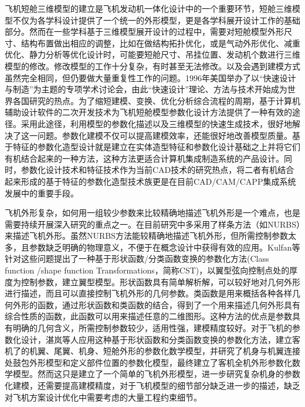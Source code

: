 \documentclass[12pt,a4paper]{report}
\begin{document}
飞机短舱三维模型的建立是飞机发动机一体化设计中的一个重要环节，短舱三维模型不仅为各学科设计提供了一个统一的外形模型，更是各学科展开设计工作的基础部分。然而在一些学科基于三维模型展开设计的过程中，需要对短舱模型外形尺寸、结构布置做出相应的调整，比如在做结构拓扑优化，或是气动外形优化、减重优化、静力分析等优化设计时，可能要短舱尺寸、吊挂位置、发动机个数进行三维模型的修改。修改模型的工作十分复杂，有时甚至无法修改。以及会遇到建模方式虽然完全相同，但仍要做大量重复性工作的问题。1996年美国举办了以“快速设计与制造”为主题的专项学术讨论会，由此“快速设计”理论、方法与技术开始成为世界各国研究的热点。为了缩短建模、变换、优化分析综合流程的周期，基于计算机辅助设计软件的二次开发技术为飞机短舱模型参数化设计方法提供了一种有效的途径。采用此途径，利用模型的参数化描述以及三维模型的快速生成技术，很好地解决了这一问题。参数化建模不仅可以提高建模效率，还能很好地改善模型质量。基于特征的参数化造型设计就是建立在实体造型特征和参数化设计基础之上并将它们有机结合起来的一种方法，这种方法更适合计算机集成制造系统的产品设计。同时，参数化设计技术和特征技术作为当前CAD技术的研究热点，将二者有机结合起来形成的基于特征的参数化造型技术族更是在目前CAD/CAM/CAPP集成系统发展中的重要手段。

飞机外形复杂，如何用一组较少参数来比较精确地描述飞机外形是一个难点，也是需要持续开展深入研究的重点之一。在目前研究中多采用了样条方法（如NURBS）来描述飞机外形。虽然NURBS方法能较精确地描述飞机外形，但所需控制参数太多，且参数缺乏明确的物理意义，不便于在概念设计中获得有效的应用。Kulfan等针对这些问题提出了一种基于形状函数/分类函数变换的参数化方法(Class function /shape function Transformations，简称CST)，以翼型弦向控制点处的厚度为控制参数，建立翼型模型。形状函数具有简单解析解，可以较好地对几何外形进行描述，而且可以直接控制飞机外形的几何参数。类函数是用来概括各种各样几何外形的函数，通过形状函数和类函数的结合，得到了一个用来描述几何外形具有综合性质的函数，此函数可以用来描述任意的二维图形。这种方法的优点是参数具有明确的几何含义，所需控制参数较少，适用性强，建模精度较好。对于飞机的参数化设计，湛岚等人应用这种基于形状函数和分类函数变换的参数化方法，建立客机了的机翼、尾翼、机身、短舱外形的参数化数学模型，并研究了机身与机翼连接处鼓包外形模型和定义部件位置的参数化模型，最终建立了客机全机外形参数化数学模型。然而这只是建立了一个简单的飞机外形模型，进一步研究复杂机身的参数化建模，还需要提高建模精度，对于飞机模型的细节部分缺乏进一步的描述，缺乏对飞机方案设计优化中需要考虑的大量工程约束细节。
\end{document}
